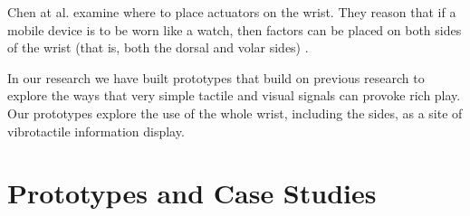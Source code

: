 \documentclass{chi-ext}
\begin{document}
Chen at al. examine where to place actuators on the wrist. They reason that if a mobile device is to be worn like a watch, then factors can be placed on both sides of the wrist (that is, both the dorsal and volar sides) \cite{chen2008tactor}. 

In our research we have built prototypes that build on previous research to explore the ways that very simple tactile and visual signals can provoke rich play. Our prototypes explore the use of the whole wrist, including the sides, as a site of vibrotactile information display. 

\section{Prototypes and Case Studies}


\end{document}
